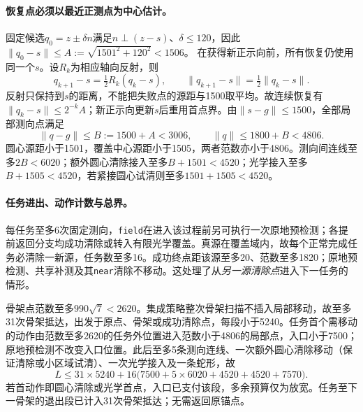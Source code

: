 \paragraph{恢复点必须以最近正测点为中心估计。}
固定候选$q_0=z\pm\delta n$满足$n\perp(z-s)$、$\delta\le120$，因此$\|q_0-s\|\le A:=\sqrt{1501^2+120^2}<1506$。
在获得新正示向前，所有恢复仍使用同一个$s$。设$R_k$为相应轴向反射，则
\[
 q_{k+1}-s=\tfrac12R_k(q_k-s),\qquad
 \|q_{k+1}-s\|=\tfrac12\|q_k-s\|.
\]
反射只保持到$s$的距离，不能把失败点的源距与1500取平均。故连续恢复有$\|q_k-s\|\le2^{-k}A$；新正示向更新$s$后重用首点界。由$\|s-g\|\le1500$，全部局部测向点满足
\begin{equation}
 \|q-g\|\le B:=1500+A<3006,\qquad
 \|q\|\le1800+B<4806.
\end{equation}
圆心源距小于1501，覆盖中心源距小于1505，两者范数亦小于4806。测向间连线至多$2B<6020$；额外圆心清除接入至多$B+1501<4520$；光学接入至多$B+1505<4520$，若紧接圆心试清则至多$1501+1505<4520$。

\paragraph{任务进出、动作计数与总界。}
每任务至多6次固定测向，\texttt{field}在进入该过程前另可执行一次原地预检测；各提前返回分支均成功清除或转入有限光学覆盖。真源在覆盖域内，故每个正常完成任务必清除一新源，任务数至多16。成功终点距该源至多20、范数至多1820；原地预检测、共享补测及其\texttt{near}清除不移动。这处理了从\emph{另一源清除点}进入下一任务的情形。

骨架点范数至多$990\sqrt7<2620$。集成策略整次骨架扫描不插入局部移动，故至多31次骨架抵达，出发于原点、骨架或成功清除点，每段小于5240。任务首个需移动的动作由范数至多2620的任务外位置进入范数小于4806的局部点，入口小于7500；原地预检测不改变入口位置。此后至多5条测向连线、一次额外圆心清除移动（保证清除或小区域试清）、一次光学接入及一条蛇形，故
\begin{equation}
 L\le31\times5240+
 16\bigl(7500+5\times6020+4520+4520+7570\bigr).
 \label{eq:corrected-travel-bound}
\end{equation}
若首动作即圆心清除或光学首点，入口已支付该段，多余预算仅为放宽。任务至下一骨架的退出段已计入31次骨架抵达；无需返回原锚点。

